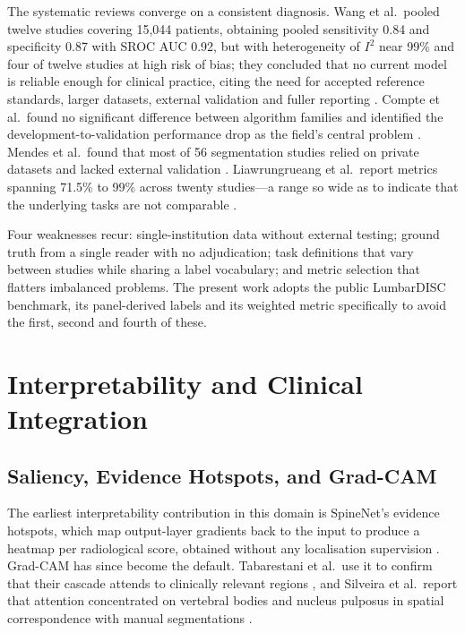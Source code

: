 The systematic reviews converge on a consistent diagnosis. Wang et al.\ pooled
twelve studies covering 15{,}044 patients, obtaining pooled sensitivity 0.84 and
specificity 0.87 with SROC AUC 0.92, but with heterogeneity of $I^2$ near 99\%
and four of twelve studies at high risk of bias; they concluded that no current
model is reliable enough for clinical practice, citing the need for accepted
reference standards, larger datasets, external validation and fuller reporting
\cite{wang2024machine}. Compte et al.\ found no significant difference between
algorithm families and identified the development-to-validation performance drop
as the field's central problem \cite{compte2023are}. Mendes et al.\ found that
most of 56 segmentation studies relied on private datasets and lacked external
validation \cite{mendes2026deep}. Liawrungrueang et al.\ report metrics spanning
71.5\% to 99\% across twenty studies---a range so wide as to indicate that the
underlying tasks are not comparable \cite{liawrungrueang2025artificial}.

Four weaknesses recur: single-institution data without external testing; ground
truth from a single reader with no adjudication; task definitions that vary
between studies while sharing a label vocabulary; and metric selection that
flatters imbalanced problems. The present work adopts the public LumbarDISC
benchmark, its panel-derived labels and its weighted metric specifically to
avoid the first, second and fourth of these.

\section{Interpretability and Clinical Integration}
\label{sec:lr-interpretability}

\subsection{Saliency, Evidence Hotspots, and Grad-CAM}
\label{sec:lr-saliency}

The earliest interpretability contribution in this domain is SpineNet's evidence
hotspots, which map output-layer gradients back to the input to produce a heatmap
per radiological score, obtained without any localisation supervision
\cite{jamaludin2017spinenet}. Grad-CAM \cite{selvaraju2017gradcam} has since
become the default. Tabarestani et al.\ use it to confirm that their cascade
attends to clinically relevant regions \cite{tabarestani2026a}, and Silveira et
al.\ report that attention concentrated on vertebral bodies and nucleus pulposus
in spatial correspondence with manual segmentations \cite{silveira2025automated}.

